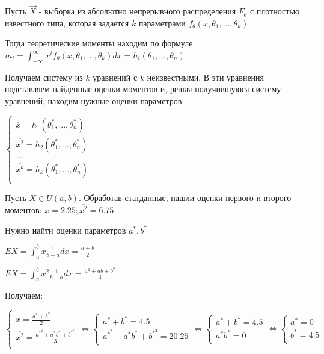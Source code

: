 \begin{enumerate}
    Пусть $\vec{X}$ - выборка из абсолютно непрерывного распределения $F_\theta$ с плотностью известного типа, 
    которая задается $k$ параметрами $f_\theta (x, \theta_1, \dots, \theta_k)$

    Тогда теоретические моменты находим по формуле $m_i = \int_{-\infty}^{\infty} x^i f_\theta (x, \theta_1, \dots, \theta_k) dx = h_i(\theta_1, \dots, \theta_n)$

    Получаем систему из $k$ уравнений с $k$ неизвестными. В эти уравнения подставляем найденные оценки
    моментов и, решая получившуюся систему уравнений, находим нужные оценки параметров

    $\begin{cases}
    \overline{x} = h_1(\theta_1^*, \dots, \theta_n^*) \\ 
    \overline{x^2} = h_2(\theta_1^*, \dots, \theta_n^*) \\ 
    \dots \\
    \overline{x^k} = h_k(\theta_1^*, \dots, \theta_n^*) \\ 
    \end{cases}$

    \Ex Пусть $X \in U(a, b)$. Обработав статданные, нашли оценки первого и второго моментов: $\overline{x} = 2.25; \overline{x^2} = 6.75$

    Нужно найти оценки параметров $a^*, b^*$

    $EX = \int_a^b x \frac{1}{b - a} dx = \frac{a + b}{2}$

    $EX = \int_a^b x^2 \frac{1}{b - a} dx = \frac{a^2 + ab + b^2}{3}$

    Получаем:

    $\begin{cases}
        \overline{x} = \frac{a^* + b^*}{2} \\ 
        \overline{x^2} = \frac{a^*^2 + a^* b^* + b^*^2}{3} \\ 
    \end{cases} \Longleftrightarrow \begin{cases}
        a^* + b^* = 4.5 \\ 
        a^*^2 + a^* b^* + b^*^2 = 20.25 \\ 
    \end{cases} \Longleftrightarrow \begin{cases}
        a^* + b^* = 4.5 \\ 
        a^* b^* = 0 \\ 
    \end{cases} \Longleftrightarrow \begin{cases}
        a^* = 0 \\ 
        b^* = 4.5 \\ 
    \end{cases}$



\end{enumerate}
